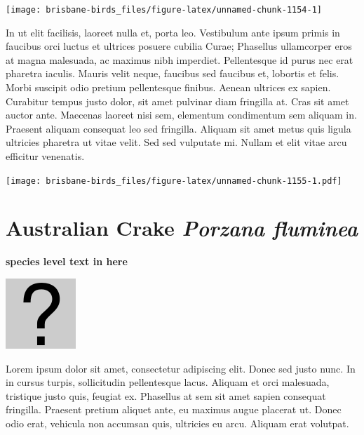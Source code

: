 \documentclass[]{book}
\let\origfigure\figure
\let\endorigfigure\endfigure
\renewenvironment{figure}[1][2] {
  \expandafter\origfigure\expandafter[H]
} {
  \endorigfigure
}
\begin{document}
\begin{figure}
\texttt{[image: brisbane-birds\_files/figure-latex/unnamed-chunk-1154-1]} \caption{insert figure caption}\label{fig:unnamed-chunk-1154}
\end{figure}

In ut elit facilisis, laoreet nulla et, porta leo. Vestibulum ante ipsum
primis in faucibus orci luctus et ultrices posuere cubilia Curae;
Phasellus ullamcorper eros at magna malesuada, ac maximus nibh
imperdiet. Pellentesque id purus nec erat pharetra iaculis. Mauris velit
neque, faucibus sed faucibus et, lobortis et felis. Morbi suscipit odio
pretium pellentesque finibus. Aenean ultrices ex sapien. Curabitur
tempus justo dolor, sit amet pulvinar diam fringilla at. Cras sit amet
auctor ante. Maecenas laoreet nisi sem, elementum condimentum sem
aliquam in. Praesent aliquam consequat leo sed fringilla. Aliquam sit
amet metus quis ligula ultricies pharetra ut vitae velit. Sed sed
vulputate mi. Nullam et elit vitae arcu efficitur venenatis.

\begin{figure}
\centering
\texttt{[image: brisbane-birds\_files/figure-latex/unnamed-chunk-1155-1.pdf]}
\caption{\label{fig:unnamed-chunk-1155}insert figure caption}
\end{figure}

\section{\texorpdfstring{Australian Crake \emph{Porzana
fluminea}}{Australian Crake Porzana fluminea}}\label{australian-crake-porzana-fluminea}

\textbf{species level text in here}

\begin{figure}
\centering
\includegraphics{assets/missing.png}
\caption{No image for species}
\end{figure}

Lorem ipsum dolor sit amet, consectetur adipiscing elit. Donec sed justo
nunc. In in cursus turpis, sollicitudin pellentesque lacus. Aliquam et
orci malesuada, tristique justo quis, feugiat ex. Phasellus at sem sit
amet sapien consequat fringilla. Praesent pretium aliquet ante, eu
maximus augue placerat ut. Donec odio erat, vehicula non accumsan quis,
ultricies eu arcu. Aliquam erat volutpat.
\end{document}
